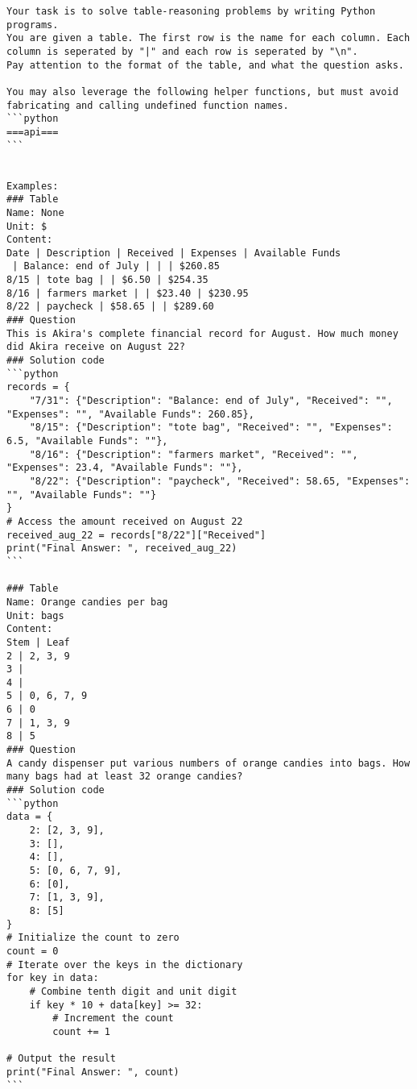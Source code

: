 \begin{tcolorbox}[title=Prompt on TabMWP, breakable, width=\textwidth,top=0mm]
\begin{Verbatim}[breaklines, fontsize=\footnotesize]
Your task is to solve table-reasoning problems by writing Python programs.
You are given a table. The first row is the name for each column. Each column is seperated by "|" and each row is seperated by "\n".
Pay attention to the format of the table, and what the question asks.

You may also leverage the following helper functions, but must avoid fabricating and calling undefined function names.
```python
===api===
```


Examples: 
### Table
Name: None
Unit: $
Content:
Date | Description | Received | Expenses | Available Funds
 | Balance: end of July | | | $260.85
8/15 | tote bag | | $6.50 | $254.35
8/16 | farmers market | | $23.40 | $230.95
8/22 | paycheck | $58.65 | | $289.60
### Question
This is Akira's complete financial record for August. How much money did Akira receive on August 22?
### Solution code
```python
records = {
    "7/31": {"Description": "Balance: end of July", "Received": "", "Expenses": "", "Available Funds": 260.85},
    "8/15": {"Description": "tote bag", "Received": "", "Expenses": 6.5, "Available Funds": ""},
    "8/16": {"Description": "farmers market", "Received": "", "Expenses": 23.4, "Available Funds": ""},
    "8/22": {"Description": "paycheck", "Received": 58.65, "Expenses": "", "Available Funds": ""}
}
# Access the amount received on August 22
received_aug_22 = records["8/22"]["Received"]
print("Final Answer: ", received_aug_22)
```

### Table
Name: Orange candies per bag
Unit: bags
Content:
Stem | Leaf 
2 | 2, 3, 9
3 | 
4 | 
5 | 0, 6, 7, 9
6 | 0
7 | 1, 3, 9
8 | 5
### Question
A candy dispenser put various numbers of orange candies into bags. How many bags had at least 32 orange candies?
### Solution code
```python
data = {
    2: [2, 3, 9],
    3: [],
    4: [],
    5: [0, 6, 7, 9],
    6: [0],
    7: [1, 3, 9],
    8: [5]
}
# Initialize the count to zero
count = 0
# Iterate over the keys in the dictionary
for key in data:
    # Combine tenth digit and unit digit
    if key * 10 + data[key] >= 32:
        # Increment the count
        count += 1

# Output the result
print("Final Answer: ", count)
```


\end{Verbatim}
\end{tcolorbox}
